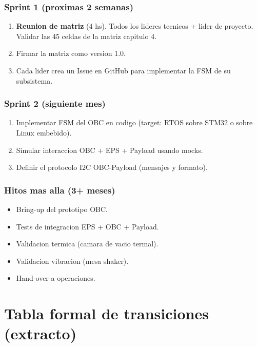 \documentclass[11pt,a4paper,oneside,openright]{book}
\begin{document}
\subsection*{Sprint 1 (proximas 2 semanas)}

\begin{enumerate}[leftmargin=2em]
  \item \textbf{Reunion de matriz} (4 hs). Todos los lideres tecnicos
    + lider de proyecto. Validar las 45 celdas de la matriz capitulo 4.
  \item Firmar la matriz como version 1.0.
  \item Cada lider crea un Issue en GitHub para implementar la FSM
    de su subsistema.
\end{enumerate}

\subsection*{Sprint 2 (siguiente mes)}

\begin{enumerate}[leftmargin=2em]
  \item Implementar FSM del OBC en codigo (target: RTOS sobre STM32
    o sobre Linux embebido).
  \item Simular interaccion OBC + EPS + Payload usando mocks.
  \item Definir el protocolo I2C OBC-Payload (mensajes y formato).
\end{enumerate}

\subsection*{Hitos mas alla (3+ meses)}

\begin{itemize}[leftmargin=2em]
  \item Bring-up del prototipo OBC.
  \item Tests de integracion EPS + OBC + Payload.
  \item Validacion termica (camara de vacio termal).
  \item Validacion vibracion (mesa shaker).
  \item Hand-over a operaciones.
\end{itemize}

\appendix
\chapter{Tabla formal de transiciones (extracto)}
\end{document}
